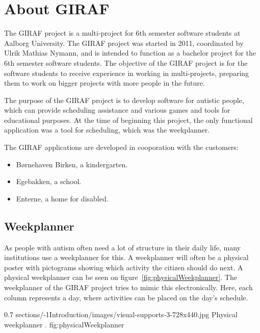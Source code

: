 \section{About GIRAF}
\label{sect:aboutGiraf}
The GIRAF project is a multi-project for 6th semester software students at Aalborg University. 
The GIRAF project was started in 2011, coordinated by Ulrik Mathias Nymann, and is intended to function as a bachelor project for the 6th semester software students. 
The objective of the GIRAF project is for the software students to receive experience in working in multi-projects, preparing them to work on bigger projects with more people in the future.

The purpose of the GIRAF project is to develop software for autistic people, which can provide scheduling assistance and various games and tools for educational purposes.
At the time of beginning this project, the only functional application was a tool for scheduling, which was the weekplanner. 

The GIRAF applications are developed in cooporation with the customers:
\begin{itemize}
    \item Børnehaven Birken, a kindergarten.
    \item Egebakken, a school.
    \item Enterne, a home for disabled.
\end{itemize}

\subsection{Weekplanner}
As people with autism often need a lot of structure in their daily life, many institutions use a weekplanner for this. A weekplanner will often be a physical poster with pictograms showing which activity the citizen should do next. A physical weekplanner can be seen on figure~\ref{fig:physicalWeekplanner}. The weekplanner of the GIRAF project tries to mimic this electronically. Here, each column represents a day, where activities can be placed on the day's schedule. 

        {0.7} %
        {sections/-1Introduction/images/visual-supports-3-728x440.jpg} %
        {Physical weekplanner \citep{cite:physicalWeekplanner}.} %
        {fig:physicalWeekplanner} %
